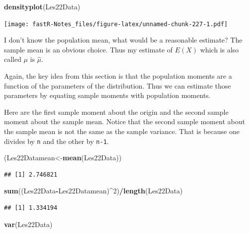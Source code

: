 \documentclass[]{book}
\newenvironment{Shaded}{\begin{snugshade}}{\end{snugshade}}
\newcommand{\KeywordTok}[1]{\textcolor[rgb]{0.13,0.29,0.53}{\textbf{#1}}}
\newcommand{\DecValTok}[1]{\textcolor[rgb]{0.00,0.00,0.81}{#1}}
\newcommand{\OperatorTok}[1]{\textcolor[rgb]{0.81,0.36,0.00}{\textbf{#1}}}
\newcommand{\NormalTok}[1]{#1}
\theoremstyle{definition}
\theoremstyle{definition}
\theoremstyle{definition}
\theoremstyle{remark}
\begin{document}
\begin{Shaded}
\begin{Highlighting}[]
\KeywordTok{densityplot}\NormalTok{(Les22Data)}
\end{Highlighting}
\end{Shaded}

\texttt{[image: fastR-Notes\_files/figure-latex/unnamed-chunk-227-1.pdf]}

I don't know the population mean, what would be a reasonable estimate?
The sample mean is an obvious choice. Thus my estimate of \(E(X)\) which
is also called \(\mu\) is \(\hat{\mu}\).

Again, the key idea from this section is that the population moments are
a function of the parameters of the distribution. Thus we can estimate
those parameters by equating sample moments with population moments.

Here are the first sample moment about the origin and the second sample
moment about the sample mean. Notice that the second sample moment about
the sample mean is not the same as the sample variance. That is because
one divides by \texttt{n} and the other by \texttt{n-1}.

\begin{Shaded}
\begin{Highlighting}[]
\NormalTok{(Les22Datamean<-}\KeywordTok{mean}\NormalTok{(Les22Data))}
\end{Highlighting}
\end{Shaded}

\begin{verbatim}
## [1] 2.746821
\end{verbatim}

\begin{Shaded}
\begin{Highlighting}[]
\KeywordTok{sum}\NormalTok{((Les22Data}\OperatorTok{-}\NormalTok{Les22Datamean)}\OperatorTok{^}\DecValTok{2}\NormalTok{)}\OperatorTok{/}\KeywordTok{length}\NormalTok{(Les22Data)}
\end{Highlighting}
\end{Shaded}

\begin{verbatim}
## [1] 1.334194
\end{verbatim}

\begin{Shaded}
\begin{Highlighting}[]
\KeywordTok{var}\NormalTok{(Les22Data)}
\end{Highlighting}
\end{Shaded}
\end{document}
